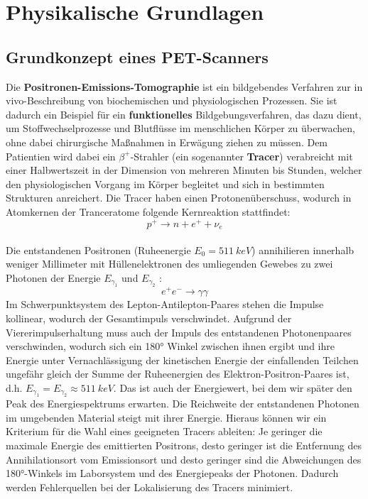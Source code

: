 \section{Physikalische Grundlagen}
\subsection{Grundkonzept eines PET-Scanners}
	Die \textbf{Positronen-Emissions-Tomographie} ist ein bildgebendes Verfahren zur in vivo-Beschreibung von biochemischen und physiologischen Prozessen. Sie ist dadurch ein Beispiel für ein \textbf{funktionelles} Bildgebungsverfahren, das dazu dient, um Stoffwechselprozesse und Blutflüsse im menschlichen Körper zu überwachen, ohne dabei chirurgische Maßnahmen in Erwägung ziehen zu müssen. Dem Patientien wird dabei ein $\beta^+$-Strahler (ein sogenannter \textbf{Tracer}) verabreicht mit einer Halbwertszeit in der Dimension von mehreren Minuten bis Stunden, welcher den physiologischen Vorgang im Körper begleitet und sich in bestimmten Strukturen anreichert. Die Tracer haben einen Protonenüberschuss, wodurch in Atomkernen der Tranceratome folgende Kernreaktion stattfindet: 
	\begin{equation*}
	p^+ \longrightarrow n + e^+ + \nu_e
	\end{equation*}\\
	Die entstandenen Positronen (Ruheenergie $E_0 = 511\ \unit{keV}$) annihilieren innerhalb weniger Millimeter mit Hüllenelektronen des umliegenden Gewebes zu zwei Photonen der Energie $E_{\gamma_1}$ und $E_{\gamma_2}$ :\\
	\begin{equation*}
		e^+ e^- \longrightarrow \gamma \gamma
	\end{equation*}
	Im Schwerpunktsystem des Lepton-Antilepton-Paares stehen die Impulse kollinear, wodurch der Gesamtimpuls verschwindet. Aufgrund der Viererimpulserhaltung muss auch der Impuls des entstandenen Photonenpaares verschwinden, wodurch sich ein 180° Winkel zwischen ihnen ergibt und ihre Energie unter Vernachlässigung der kinetischen Energie der einfallenden Teilchen ungefähr gleich der Summe der Ruheenergien des Elektron-Positron-Paares ist, d.h. $E_{\gamma_1} = E_{\gamma_2} \approx 511\ \unit{keV}$. Das ist auch der Energiewert, bei dem wir später den Peak des Energiespektrums erwarten. Die Reichweite der entstandenen Photonen im umgebenden Material steigt mit ihrer Energie. Hieraus können wir ein Kriterium für die Wahl eines geeigneten Tracers ableiten: Je geringer die maximale Energie des emittierten Positrons, desto geringer ist die Entfernung des Annihilationsort vom Emissionsort und desto geringer sind die Abweichungen des 180°-Winkels im Laborsystem und des Energiepeaks der Photonen. Dadurch werden Fehlerquellen bei der Lokalisierung des Tracers minimiert.\\
	
